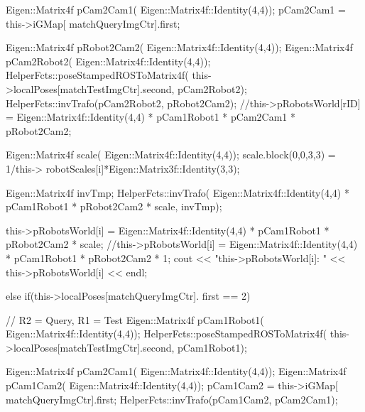 \begin{DoxyCode}
{{{{{                                        Eigen::Matrix4f pCam2Cam1(
      Eigen::Matrix4f::Identity(4,4));
                                        pCam2Cam1 = this->iGMap[
      matchQueryImgCtr].first;

                                        Eigen::Matrix4f pRobot2Cam2(
      Eigen::Matrix4f::Identity(4,4));
                                        Eigen::Matrix4f pCam2Robot2(
      Eigen::Matrix4f::Identity(4,4));
                                        HelperFcts::poseStampedROSToMatrix4f(
      this->localPoses[matchTestImgCtr].second, pCam2Robot2);
                                        HelperFcts::invTrafo(pCam2Robot2, 
      pRobot2Cam2);
                                        //this->pRobotsWorld[rID] =
       Eigen::Matrix4f::Identity(4,4) * pCam1Robot1 * pCam2Cam1 * pRobot2Cam2;

                                        Eigen::Matrix4f scale(
      Eigen::Matrix4f::Identity(4,4));
                                        scale.block(0,0,3,3) = 1/this->
      robotScales[i]*Eigen::Matrix3f::Identity(3,3);

                                        Eigen::Matrix4f invTmp;
                                        HelperFcts::invTrafo(
      Eigen::Matrix4f::Identity(4,4) * pCam1Robot1 * pRobot2Cam2 * scale, invTmp);

                                        this->pRobotsWorld[i] = 
      Eigen::Matrix4f::Identity(4,4) * pCam1Robot1 * pRobot2Cam2 * scale;
                                        //this->pRobotsWorld[i] =
       Eigen::Matrix4f::Identity(4,4) * pCam1Robot1 * pRobot2Cam2 * 1;
                                        cout << "this->pRobotsWorld[i]: " << 
      this->pRobotsWorld[i] << endl;
                                }
                                else if(this->localPoses[matchQueryImgCtr].
      first == 2) {
                                        // R2 = Query, R1 = Test
                                        Eigen::Matrix4f pCam1Robot1(
      Eigen::Matrix4f::Identity(4,4));
                                        HelperFcts::poseStampedROSToMatrix4f(
      this->localPoses[matchTestImgCtr].second, pCam1Robot1);

                                        Eigen::Matrix4f pCam2Cam1(
      Eigen::Matrix4f::Identity(4,4));
                                        Eigen::Matrix4f pCam1Cam2(
      Eigen::Matrix4f::Identity(4,4));
                                        pCam1Cam2 = this->iGMap[
      matchQueryImgCtr].first;
                                        HelperFcts::invTrafo(pCam1Cam2, 
      pCam2Cam1);

}}}}}
\end{DoxyCode}
